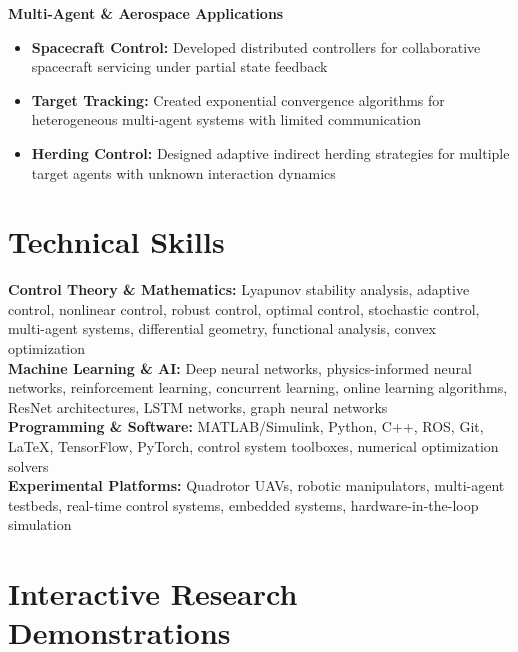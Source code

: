 \documentclass[10pt, letterpaper]{article}
\begin{document}
\textbf{Multi-Agent \& Aerospace Applications}
\begin{itemize}[leftmargin=20pt, itemsep=1pt]
    \item \textbf{Spacecraft Control:} Developed distributed controllers for collaborative spacecraft servicing under partial state feedback
    \item \textbf{Target Tracking:} Created exponential convergence algorithms for heterogeneous multi-agent systems with limited communication
    \item \textbf{Herding Control:} Designed adaptive indirect herding strategies for multiple target agents with unknown interaction dynamics
\end{itemize}

\section{Technical Skills}

\textbf{Control Theory \& Mathematics:} Lyapunov stability analysis, adaptive control, nonlinear control, robust control, optimal control, stochastic control, multi-agent systems, differential geometry, functional analysis, convex optimization\\

\textbf{Machine Learning \& AI:} Deep neural networks, physics-informed neural networks, reinforcement learning, concurrent learning, online learning algorithms, ResNet architectures, LSTM networks, graph neural networks\\

\textbf{Programming \& Software:} MATLAB/Simulink, Python, C++, ROS, Git, \LaTeX, TensorFlow, PyTorch, control system toolboxes, numerical optimization solvers\\

\textbf{Experimental Platforms:} Quadrotor UAVs, robotic manipulators, multi-agent testbeds, real-time control systems, embedded systems, hardware-in-the-loop simulation

\section{Interactive Research Demonstrations}
\end{document}
